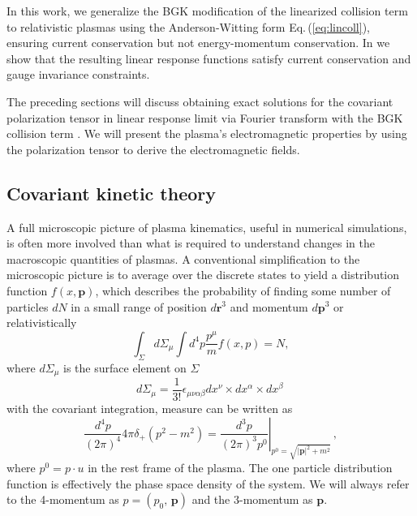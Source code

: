 In this work, we generalize the BGK modification of the linearized collision term to relativistic plasmas using the Anderson-Witting form Eq.\,(\ref{eq:lincoll}), ensuring current conservation  but not energy-momentum conservation. In \cite{Formanek:2021blc} we show that the resulting linear response functions satisfy current conservation and gauge invariance constraints. 

The preceding sections will discuss obtaining exact solutions for the covariant polarization tensor in linear response limit via Fourier transform with the BGK collision term . We will present the plasma's electromagnetic properties by using the polarization tensor to derive the electromagnetic fields.

\subsection{Covariant kinetic theory}\label{sec:CKT}
A full microscopic picture of plasma kinematics, useful in numerical simulations, is often more involved than what is required to understand changes in the macroscopic quantities of plasmas. A conventional simplification to the microscopic picture is to average over the discrete states to yield a distribution function $f(x,\boldsymbol{p})$, which describes the probability of finding some number of particles $dN$ in a small range of position $d\mathbf{r}^3$ and momentum $d\boldsymbol{p}^3$ or relativistically~\cite{Hakim:2011bk}
\begin{equation}
    \int_{\Sigma}d\Sigma_{\mu}\int  d^4p\frac{p^\mu}{m}f(x,p) = N,
\end{equation}
where $d\Sigma_\mu$ is the surface element on $\Sigma$
\begin{equation}
    d\Sigma_\mu = \frac{1}{3!}\epsilon_{\mu \nu \alpha\beta} dx^\nu \times dx^\alpha\times dx^\beta\,
\end{equation}
with the covariant integration, measure can be written as
\begin{equation}\label{eq:measure} 
 \frac{d^4p}{(2\pi)^4}4\pi \delta_+(p^2-m^2) = \left.\frac{d^3p}{(2\pi)^3p^0}\right|_{p^0 = \sqrt{|\boldsymbol{p}|^2 + m^2}} \,,
\end{equation}
where $p^0 = p \cdot u$ in the rest frame of the plasma. The one particle distribution function is effectively the phase space density of the system. We will always refer to the 4-momentum as $p = (p_0, \, \boldsymbol{p})$ and the 3-momentum as $\boldsymbol{p}$.

